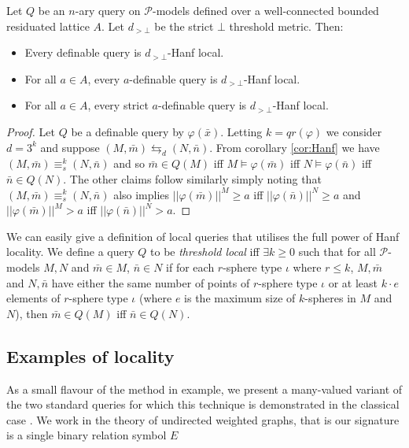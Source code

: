 \documentclass{lmcs} %
\newcommand{\?}{\ensuremath{\mkern0.4\thinmuskip}}
\let\phi=\varphi
\newcommand{\CP}{\mathcal{P}}
\begin{document}
\begin{cor}
    Let $Q$ be an $n$-ary query on $\CP$-models defined over a well-connected bounded residuated lattice $A$. Let $d_{>\bot}$ be the strict $\bot$ threshold metric. Then:\begin{itemize}
        \item Every definable query is $d_{>\bot}$-Hanf local.
        \item For all $a\in A$, every $a$-definable query is $d_{>\bot}$-Hanf local.
        \item For all $a\in A$, every strict $a$-definable query is $d_{>\bot}$-Hanf local.
    \end{itemize}
\end{cor}
\begin{proof}
    Let $Q$ be a definable query by $\phi(\bar{x})$. Letting $k=qr(\phi)$ we consider $d=3^k$ and suppose $(M,\bar{m})\leftrightarrows_d (N,\bar{n})$. From corollary \ref{cor:Hanf} we have $(M,\bar{m})\equiv^k_s(N,\bar{n})$ and so $\bar{m}\in Q(M)$ iff $M\models\phi(\bar{m})$ iff $N\models\phi(\bar{n})$ iff $\bar{n}\in Q(N)$. The other claims follow similarly simply noting that $(M,\bar{m})\equiv^k_s (N,\bar{n})$ also implies $||\phi(\bar{m})||^M\geq a$ iff $||\phi(\bar{n})||^N\geq a$ and $||\phi(\bar{m})||^M> a$ iff $||\phi(\bar{n})||^N>a$.
\end{proof}
\begin{rem}
    We can easily give a definition of local queries that utilises the full power of Hanf locality. We define a query $Q$ to be \textit{threshold local} iff $\exists k\geq 0$ such that for all $\CP$-models $M,N$ and $\bar{m}\in M$, $\bar{n}\in N$ if for each $r$-sphere type $\iota$ where $r\leq k$, $M,\bar{m}$ and $N,\bar{n}$ have either the same number of points of $r$-sphere type $\iota$ or at least $k\cdot e$ elements of $r$-sphere type $\iota$ (where $e$ is the maximum size of $k$-spheres in $M$ and $N$), then $\bar{m}\in Q(M)$ iff $\bar{n}\in Q(N)$.
\end{rem}

\subsection{Examples of locality}
As a small flavour of the method in example, we present a many-valued variant of the two standard queries for which this technique is demonstrated in the classical case \cite[Chapter 2]{Gradeletal07:Finitemodelapplication}. We work in the theory of undirected weighted graphs, that is our signature is a single binary relation symbol $E$ 
\end{document}
